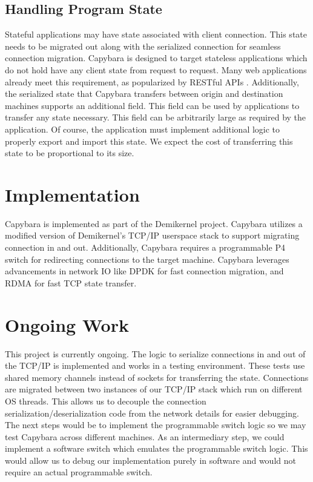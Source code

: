 \subsection{Handling Program State}
Stateful applications may have state associated with client connection. This state needs to be migrated out along with the serialized connection for seamless connection migration. Capybara is designed to target stateless applications which do not hold have any client state from request to request. Many web applications already meet this requirement, as popularized by RESTful APIs \cite{restful-apis}.
Additionally, the serialized state that Capybara transfers between origin and destination machines supports an additional  field. This field can be used by applications to transfer any state necessary. This field can be arbitrarily large as required by the application. Of course, the application must implement additional logic to properly export and import this state. We expect the cost of transferring this state to be proportional to its size.

\section{Implementation}
Capybara is implemented as part of the Demikernel project. Capybara utilizes a modified version of Demikernel's TCP/IP userspace stack to support migrating connection in and out. Additionally, Capybara requires a programmable P4 switch for redirecting connections to the target machine. Capybara leverages advancements in network IO like DPDK for fast connection migration, and RDMA for fast TCP state transfer.

\section{Ongoing Work}
This project is currently ongoing. The logic to serialize connections in and out of the TCP/IP is implemented and works in a testing environment. These tests use shared memory channels instead of sockets for transferring the state. Connections are migrated between two instances of our TCP/IP stack which run on different OS threads. This allows us to decouple the connection serialization/deserialization code from the network details for easier debugging.
The next steps would be to implement the programmable switch logic so we may test Capybara across different machines. As an intermediary step, we could implement a software switch which emulates the programmable switch logic. This would allow us to debug our implementation purely in software and would not require an actual programmable switch.


